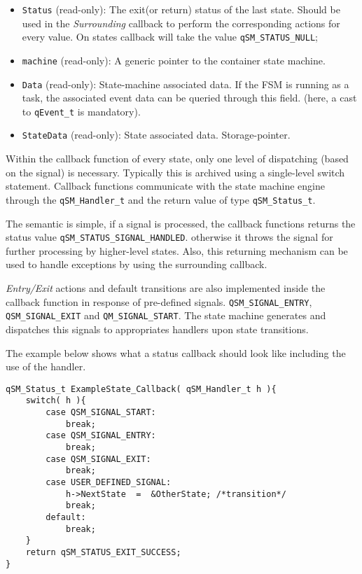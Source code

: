 \begin{itemize}
\begin{itemize}
    \end{itemize}
    \item \lstinline{Status} (read-only): The exit(or return) status of the last state. Should be used in the \textit{Surrounding} callback to perform the corresponding actions for every value. On states callback will take the value \lstinline{qSM_STATUS_NULL};
    \item \lstinline{machine} (read-only):  A generic pointer to the container state machine.
    \item \lstinline{Data} (read-only): State-machine associated data. If the FSM is running as a task, the associated event data can be queried through this field. (here, a cast to \lstinline{qEvent_t} is mandatory).
    \item \lstinline{StateData} (read-only): State associated data. Storage-pointer.
\end{itemize}


Within the callback function of every state, only one level of dispatching (based on the signal) is necessary. Typically this is archived using a single-level switch statement.
Callback functions communicate with the state machine engine through the \lstinline{qSM_Handler_t} and the return value of type \lstinline{qSM_Status_t}.

The semantic is simple, if a signal is processed, the callback functions returns the status value \lstinline{qSM_STATUS_SIGNAL_HANDLED}. otherwise it throws the signal for further processing by higher-level states. Also, this returning mechanism can be used to handle exceptions by using the surrounding callback.

\textit{Entry/Exit} actions and default transitions are also implemented inside the callback function in response of pre-defined signals. \lstinline{QSM_SIGNAL_ENTRY}, \lstinline{QSM_SIGNAL_EXIT} and \lstinline{QM_SIGNAL_START}.
The state machine generates and dispatches this signals to appropriates handlers upon state transitions.

The example below shows what a status callback should look like including the use of the handler.
\medskip

\begin{lstlisting}[style=CStyle]
qSM_Status_t ExampleState_Callback( qSM_Handler_t h ){
    switch( h ){
        case QSM_SIGNAL_START:
            break;
        case QSM_SIGNAL_ENTRY:
            break;
        case QSM_SIGNAL_EXIT:
            break;
        case USER_DEFINED_SIGNAL:
            h->NextState  =  &OtherState; /*transition*/
            break;
        default:
            break;
    }
    return qSM_STATUS_EXIT_SUCCESS;
}
\end{lstlisting} 

